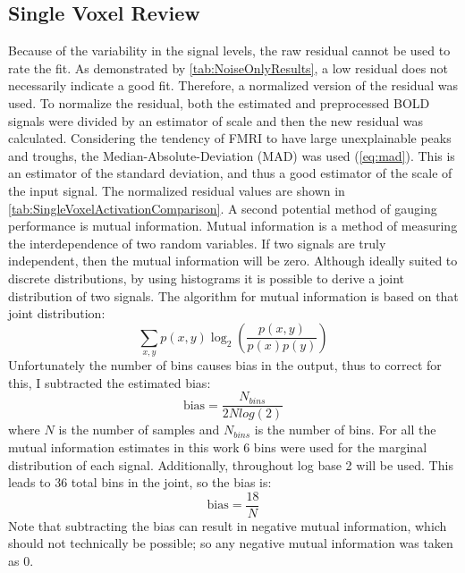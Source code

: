\subsection{Single Voxel Review}
\label{sec:SingleVoxelReview}
Because of the variability in the signal levels, the
raw residual cannot be used to rate the fit. As demonstrated by \autoref{tab:NoiseOnlyResults},
a low residual does not necessarily indicate a good fit.
Therefore, a normalized version of the residual was used. To normalize the
residual, both the estimated and preprocessed BOLD signals were divided by an estimator
of scale and then the new residual was calculated.
Considering the tendency of FMRI to have large unexplainable
peaks and troughs, the Median-Absolute-Deviation (MAD) was used (\autoref{eq:mad}).
This is an estimator of the standard
deviation, and thus a good estimator of the scale of the input signal.
The normalized residual values are
shown in \autoref{tab:SingleVoxelActivationComparison}. A second potential method of
gauging performance is mutual information. Mutual information is a method of measuring
the interdependence of two random variables. If two signals are truly independent,
then the mutual information will be zero. Although ideally suited to discrete
distributions, by using histograms
it is possible to derive a joint distribution of two signals. The algorithm for
mutual information is based on that joint distribution:
\begin{equation}
\sum_{x,y} p(x,y) \log_2\left(\frac{p(x,y)}{p(x)p(y)}\right)
\end{equation}
Unfortunately the number of bins causes bias in the output, thus to correct for this,
I subtracted the estimated bias:
\begin{equation}
\text{bias} = \frac{N_{bins}}{2Nlog(2)}
\end{equation}
where $N$ is the number of samples and $N_{bins}$ is the number of bins. For all
the mutual information estimates in this work 6 bins were used for the marginal
distribution of each signal. Additionally, throughout log base 2 will be used.
This leads to 36 total bins in the joint, so the bias is:
\begin{equation}
\text{bias} = \frac{18}{N}
\end{equation}
 Note that subtracting the bias can result in negative mutual
information, which should not technically be possible; so any negative mutual information
was taken as 0.

